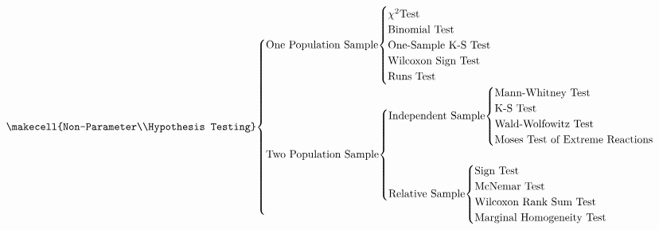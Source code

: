 \documentclass[11pt,a4paper]{ctexart}
\numberwithin{equation}{section}%
\begin{document}
\[
    \text{\makecell{Non-Parameter\\Hypothesis Testing}}
    \smash[htbp]{
    \begin{cases}
        \text{One Population Sample}
            \smash[t]{
                \begin{cases}
                    \chi^2\text{Test}\\
                    \text{Binomial Test}\\
                    \text{One-Sample K-S Test}\\
                    \text{Wilcoxon Sign Test}\\
                    \text{Runs Test}
                \end{cases}
            }\\
            \\
            \\
            \\
            \\
        \text{Two Population Sample}
            \smash[t]{
                \begin{cases}
                    \text{Independent Sample}
                    \smash[t]{
                        \begin{cases}
                            \text{Mann-Whitney Test}\\
                            \text{K-S Test}\\
                            \text{Wald-Wolfowitz Test}\\
                            \text{Moses Test of Extreme Reactions}
                        \end{cases}
                    }\\
                    \\
                    \text{Relative Sample}
                    \smash[b]{
                        \begin{cases}
                            \text{Sign Test}\\
                            \text{McNemar Test}\\
                            \text{Wilcoxon Rank Sum Test}\\
                            \text{Marginal Homogeneity Test}
                        \end{cases}
                    }
                \end{cases}
            }\\
            \\

\end{cases}}\]
\end{document}
